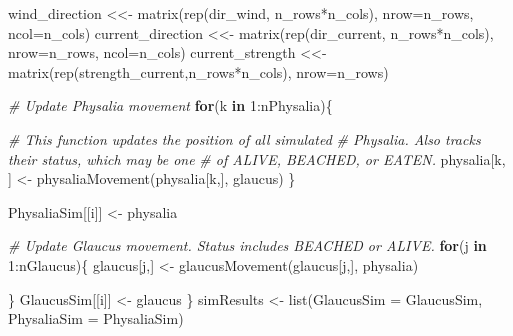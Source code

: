 \documentclass[
]{article}
\newenvironment{Shaded}{\begin{snugshade}}{\end{snugshade}}
\newcommand{\AttributeTok}[1]{\textcolor[rgb]{0.77,0.63,0.00}{#1}}
\newcommand{\CommentTok}[1]{\textcolor[rgb]{0.56,0.35,0.01}{\textit{#1}}}
\newcommand{\ControlFlowTok}[1]{\textcolor[rgb]{0.13,0.29,0.53}{\textbf{#1}}}
\newcommand{\DecValTok}[1]{\textcolor[rgb]{0.00,0.00,0.81}{#1}}
\newcommand{\FunctionTok}[1]{\textcolor[rgb]{0.00,0.00,0.00}{#1}}
\newcommand{\NormalTok}[1]{#1}
\newcommand{\OtherTok}[1]{\textcolor[rgb]{0.56,0.35,0.01}{#1}}
\newcommand{\SpecialCharTok}[1]{\textcolor[rgb]{0.00,0.00,0.00}{#1}}
\newcommand{\StringTok}[1]{\textcolor[rgb]{0.31,0.60,0.02}{#1}}
\begin{document}
\begin{Shaded}
\begin{Highlighting}[]
\NormalTok{    wind\_direction }\OtherTok{\textless{}\textless{}{-}} \FunctionTok{matrix}\NormalTok{(}\FunctionTok{rep}\NormalTok{(dir\_wind, n\_rows}\SpecialCharTok{*}\NormalTok{n\_cols), }
                              \AttributeTok{nrow=}\NormalTok{n\_rows, }\AttributeTok{ncol=}\NormalTok{n\_cols)}
\NormalTok{    current\_direction }\OtherTok{\textless{}\textless{}{-}} \FunctionTok{matrix}\NormalTok{(}\FunctionTok{rep}\NormalTok{(dir\_current, n\_rows}\SpecialCharTok{*}\NormalTok{n\_cols), }
                                 \AttributeTok{nrow=}\NormalTok{n\_rows, }\AttributeTok{ncol=}\NormalTok{n\_cols)}
\NormalTok{    current\_strength }\OtherTok{\textless{}\textless{}{-}} \FunctionTok{matrix}\NormalTok{(}\FunctionTok{rep}\NormalTok{(strength\_current,n\_rows}\SpecialCharTok{*}\NormalTok{n\_cols), }
                                \AttributeTok{nrow=}\NormalTok{n\_rows)}
    
    \CommentTok{\# Update Physalia movement}
    \ControlFlowTok{for}\NormalTok{(k }\ControlFlowTok{in} \DecValTok{1}\SpecialCharTok{:}\NormalTok{nPhysalia)\{}
      
      \CommentTok{\# This function updates the position of all simulated}
      \CommentTok{\# Physalia. Also tracks their \textquotesingle{}status\textquotesingle{}, which may be one}
      \CommentTok{\# of \textquotesingle{}ALIVE\textquotesingle{}, \textquotesingle{}BEACHED\textquotesingle{}, or \textquotesingle{}EATEN\textquotesingle{}.}
\NormalTok{      physalia[k, ] }\OtherTok{\textless{}{-}} \FunctionTok{physaliaMovement}\NormalTok{(physalia[k,], glaucus)}
\NormalTok{    \}}
    
\NormalTok{    PhysaliaSim[[i]] }\OtherTok{\textless{}{-}}\NormalTok{ physalia}
    
    
    \CommentTok{\# Update Glaucus movement. Status includes \textquotesingle{}BEACHED\textquotesingle{} or \textquotesingle{}ALIVE\textquotesingle{}.}
    \ControlFlowTok{for}\NormalTok{(j }\ControlFlowTok{in} \DecValTok{1}\SpecialCharTok{:}\NormalTok{nGlaucus)\{}
\NormalTok{      glaucus[j,] }\OtherTok{\textless{}{-}} \FunctionTok{glaucusMovement}\NormalTok{(glaucus[j,], physalia)}
      
\NormalTok{    \}}
\NormalTok{    GlaucusSim[[i]] }\OtherTok{\textless{}{-}}\NormalTok{ glaucus}
\NormalTok{  \}}
\NormalTok{  simResults }\OtherTok{\textless{}{-}} \FunctionTok{list}\NormalTok{(}\StringTok{\textquotesingle{}GlaucusSim\textquotesingle{}} \OtherTok{=}\NormalTok{ GlaucusSim,}
                     \StringTok{\textquotesingle{}PhysaliaSim\textquotesingle{}} \OtherTok{=}\NormalTok{ PhysaliaSim)}
  

\end{Highlighting}
\end{Shaded}
\end{document}
